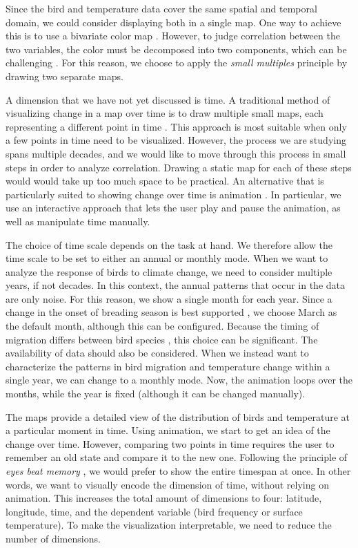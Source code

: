 \documentclass[journal]{vgtc}                %
\begin{document}
Since the bird and temperature data cover the same spatial and temporal domain, we could consider displaying both in a single map. One way to achieve this is to use a bivariate color map \cite{brewer99color,rheingans2000task}. However, to judge correlation between the two variables, the color must be decomposed into two components, which can be challenging \cite{rheingans2000task}. For this reason, we choose to apply the \emph{small multiples} principle \cite{munzner2014visualization} by drawing two separate maps.

A dimension that we have not yet discussed is time. A traditional method of visualizing change in a map over time is to draw multiple small maps, each representing a different point in time \cite{bertin1983semiology}. This approach is most suitable when only a few points in time need to be visualized. However, the process we are studying spans multiple decades, and we would like to move through this process in small steps in order to analyze correlation. Drawing a static map for each of these steps would would take up too much space to be practical. An alternative that is particularly suited to showing change over time is animation \cite{peterson1995interactive}. In particular, we use an interactive approach that lets the user play and pause the animation, as well as manipulate time manually.

The choice of time scale depends on the task at hand. We therefore allow the time scale to be set to either an annual or monthly mode. When we want to analyze the response of birds to climate change, we need to consider multiple years, if not decades. In this context, the annual patterns that occur in the data are only noise. For this reason, we show a single month for each year. Since a change in the onset of breading season is best supported \cite{marra2005influence,cotton2003avian,jenni2003timing}, we choose March as the default month, although this can be configured. Because the timing of migration differs between bird species \cite{jenni2003timing}, this choice can be significant. The availability of data should also be considered. When we instead want to characterize the patterns in bird migration and temperature change within a single year, we can change to a monthly mode. Now, the animation loops over the months, while the year is fixed (although it can be changed manually).

The maps provide a detailed view of the distribution of birds and temperature at a particular moment in time. Using animation, we start to get an idea of the change over time. However, comparing two points in time requires the user to remember an old state and compare it to the new one. Following the principle of \emph{eyes beat memory} \cite{munzner2014visualization}, we would prefer to show the entire timespan at once. In other words, we want to visually encode the dimension of time, without relying on animation. This increases the total amount of dimensions to four: latitude, longitude, time, and the dependent variable (bird frequency or surface temperature). To make the visualization interpretable, we need to reduce the number of dimensions.
\end{document}
